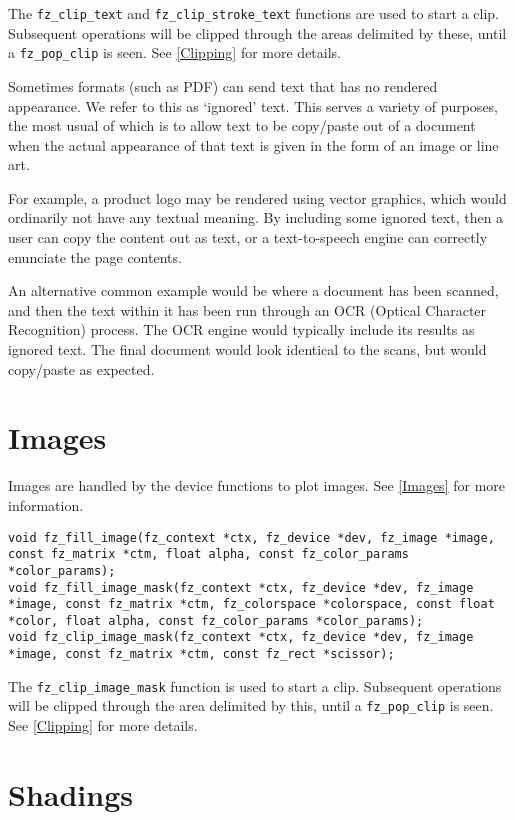 \documentclass[oneside]{book}
\newcommand{\rjwref}[1] {\autoref{#1} \nameref{#1}}
\begin{document}
The \texttt{fz\_clip\_text} and \texttt{fz\_clip\_stroke\_text} functions are used to start a clip. Subsequent operations will be clipped through the areas delimited by these, until a \texttt{fz\_pop\_clip} is seen. See \rjwref{Clipping} for more details.

Sometimes formats (such as PDF) can send text that has no rendered appearance. We refer to this as `ignored' text. This serves a variety of purposes, the most usual of which is to allow text to be copy/paste out of a document when the actual appearance of that text is given in the form of an image or line art.

For example, a product logo may be rendered using vector graphics, which would ordinarily not have any textual meaning. By including some ignored text, then a user can copy the content out as text, or a text-to-speech engine can correctly enunciate the page contents.

An alternative common example would be where a document has been scanned, and then the text within it has been run through an OCR (Optical Character Recognition) process. The OCR engine would typically include its results as ignored text. The final document would look identical to the scans, but would copy/paste as expected.

\section{Images}
\label{DeviceImages}

Images are handled by the device functions to plot images. See \rjwref{Images} for more information.

\begin{lstlisting}
void fz_fill_image(fz_context *ctx, fz_device *dev, fz_image *image, const fz_matrix *ctm, float alpha, const fz_color_params *color_params);
void fz_fill_image_mask(fz_context *ctx, fz_device *dev, fz_image *image, const fz_matrix *ctm, fz_colorspace *colorspace, const float *color, float alpha, const fz_color_params *color_params);
void fz_clip_image_mask(fz_context *ctx, fz_device *dev, fz_image *image, const fz_matrix *ctm, const fz_rect *scissor);
\end{lstlisting}

The \texttt{fz\_clip\_image\_mask} function is used to start a clip. Subsequent operations will be clipped through the area delimited by this, until a \texttt{fz\_pop\_clip} is seen. See \rjwref{Clipping} for more details.

\section{Shadings}
\end{document}
